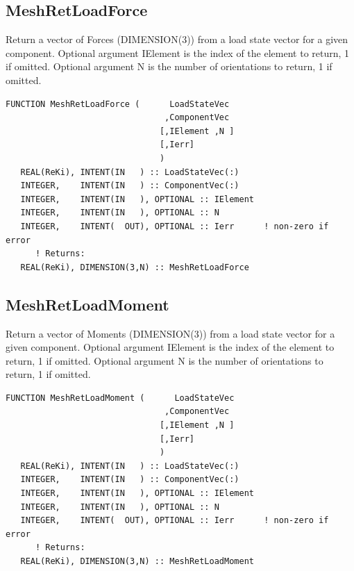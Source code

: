 \documentclass[11pt]{article}
\begin{document}
\subsection{MeshRetLoadForce}
Return a vector of Forces (DIMENSION(3)) from a load state vector for a given component.
Optional argument IElement is the index of the element to return, 1 if omitted.
Optional argument N is the number of orientations to return, 1 if omitted.
\begin{verbatim}
FUNCTION MeshRetLoadForce (      LoadStateVec
                                ,ComponentVec 
                               [,IElement ,N ]
                               [,Ierr]
                               )
   REAL(ReKi), INTENT(IN   ) :: LoadStateVec(:)
   INTEGER,    INTENT(IN   ) :: ComponentVec(:)
   INTEGER,    INTENT(IN   ), OPTIONAL :: IElement
   INTEGER,    INTENT(IN   ), OPTIONAL :: N
   INTEGER,    INTENT(  OUT), OPTIONAL :: Ierr 		! non-zero if error
      ! Returns:
   REAL(ReKi), DIMENSION(3,N) :: MeshRetLoadForce
\end{verbatim}

\subsection{MeshRetLoadMoment}
Return a vector of Moments (DIMENSION(3)) from a load state vector for a given component.
Optional argument IElement is the index of the element to return, 1 if omitted.
Optional argument N is the number of orientations to return, 1 if omitted.
\begin{verbatim}
FUNCTION MeshRetLoadMoment (      LoadStateVec
                                ,ComponentVec 
                               [,IElement ,N ]
                               [,Ierr]
                               )
   REAL(ReKi), INTENT(IN   ) :: LoadStateVec(:)
   INTEGER,    INTENT(IN   ) :: ComponentVec(:)
   INTEGER,    INTENT(IN   ), OPTIONAL :: IElement
   INTEGER,    INTENT(IN   ), OPTIONAL :: N
   INTEGER,    INTENT(  OUT), OPTIONAL :: Ierr 		! non-zero if error
      ! Returns:
   REAL(ReKi), DIMENSION(3,N) :: MeshRetLoadMoment
\end{verbatim}
\end{document}

